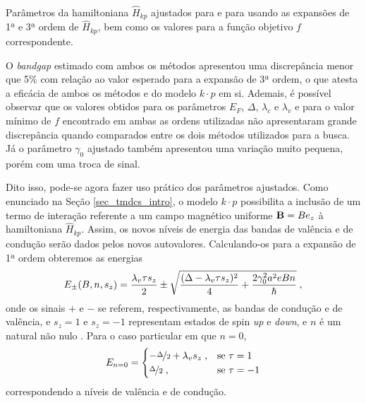\begin{table}[p]
  \centering
  \begin{subtable}{\textwidth}
    \centering
    
    \caption{}
    \label{tab:crs2}
  \end{subtable}
  \\
  \vspace{0.6cm}
  \begin{subtable}{\textwidth}
    \centering
    
    \caption{}
    \label{tab:crse2}
  \end{subtable}
  \caption{
    Parâmetros da hamiltoniana $ \hat{H}_{kp} $ ajustados para  
    e para   usando as expansões de 1ª e 3ª ordem
    de $ \hat{H}_{kp} $, bem como os valores para a função objetivo $f$ correspondente.
  }
  \label{tab:fit_results}
\end{table}

O \textit{bandgap} estimado com ambos os métodos apresentou uma discrepância
menor que 5\% com relação ao valor esperado para a expansão de 3ª ordem, o que
atesta a eficácia de ambos os métodos e do modelo $ k \cdot p $ em si. Ademais,
é possível observar que os valores obtidos para os parâmetros $E_F$, $\Delta$,
$\lambda_c$ e $\lambda_v$ e para o valor mínimo de $f$ encontrado em ambas as
ordens utilizadas não apresentaram grande discrepância quando comparados entre
os dois métodos utilizados para a busca. Já o parâmetro $\gamma_0$ ajustado
também apresentou uma variação muito pequena, porém com uma troca de sinal.

Dito isso, pode-se agora fazer uso prático dos parâmetros ajustados. Como
enunciado na Seção \ref{sec_tmdcs_intro}, o modelo $ k \cdot p $ possibilita a
inclusão de um termo de interação referente a um campo magnético uniforme 
$ \mathbf{B} = B e_z $ à hamiltoniana $ \hat{H}_{kp} $. Assim, os novos níveis de
energia das bandas de valência e de condução serão dados pelos novos
autovalores. Calculando-os para a expansão de 1ª ordem obteremos as energias
\begin{equation}
  E_\pm (B, n, s_z) = \frac{\lambda_v \tau s_z}{2} \pm 
  \sqrt{
    \frac{(\Delta - \lambda_v \tau s_z)^2}{4} + 
    \frac{2 \gamma_0^2 a^2 e B n}{\hbar}
  }
  \;\mathrm{,}
  \label{eq:landau_levels}
\end{equation}
onde os sinais $+$ e $-$ se referem, respectivamente, as bandas de condução e de
valência, e $ s_z = 1 $ e $ s_z = -1 $ representam estados de spin \textit{up} e
\textit{down}, e $n$ é um natural não nulo \cite{dias2016tmdc,dias2016article,rose2013}. Para o caso
particular em que $ n = 0 $, 
\begin{equation}
  E_{n = 0} =
  \begin{cases}
    - \nicefrac{\Delta}{2} + \lambda_v s_z \;, & \text{se } \tau = 1  \\
    \nicefrac{\Delta}{2}                   \;, & \text{se } \tau = -1 \\
  \end{cases}
  \label{eq:landau_level_for_null_n}
\end{equation}
correspondendo a níveis de valência e de condução.


